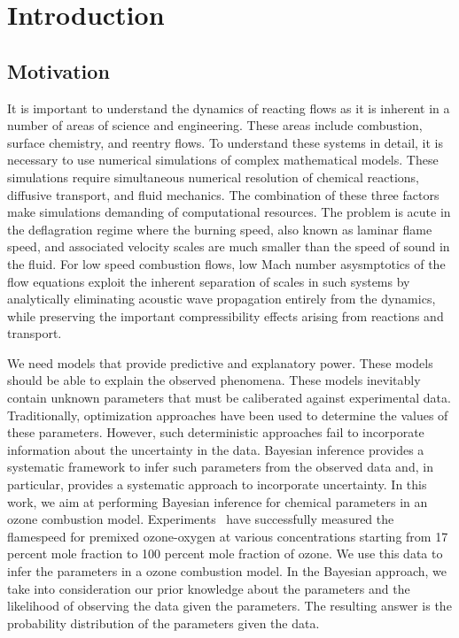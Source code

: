 
\chapter{Introduction}

\section{Motivation}
It is important to understand the dynamics of reacting flows as it is
inherent in a number of areas of science and engineering. These areas include
combustion, surface chemistry, and reentry flows. To understand these
systems in detail, it is necessary to use numerical simulations of
complex mathematical models. These
simulations require simultaneous numerical resolution of chemical
reactions, diffusive transport, and fluid mechanics. The combination
of these three factors make simulations demanding of computational
resources. The problem is acute in the deflagration regime where the
burning speed, also known as laminar flame speed, and associated
velocity scales are much smaller than the speed of sound in the fluid.
%
For low speed combustion flows, low Mach number asysmptotics
of the flow equations exploit the inherent separation of scales in
such systems by analytically eliminating acoustic wave propagation
entirely from the dynamics, while preserving the important
compressibility effects arising from reactions and transport.

\bigskip
\noindent
We need models that provide predictive and explanatory
power. These models should be able to explain the observed
phenomena.
These models inevitably contain unknown
parameters that must be caliberated against experimental
data. Traditionally, optimization approaches have been used to
determine the values of these parameters. However,
such deterministic approaches fail to incorporate information about
the uncertainty in the data. Bayesian inference provides a systematic
framework to infer such parameters from the observed data and, in
particular, provides a systematic approach to incorporate uncertainty.
In this work, we aim at performing Bayesian inference for chemical
parameters in an ozone combustion model. Experiments~\cite{Streng} have
successfully measured the flamespeed for premixed ozone-oxygen at
various concentrations starting from 17 percent mole fraction to 100 percent
mole fraction of ozone. We use this data to infer the
parameters in a ozone combustion model. In the Bayesian approach, we take
into consideration our prior knowledge about the parameters and the
likelihood of observing the data given the parameters. The resulting
answer is the probability distribution of the parameters given the
data.


